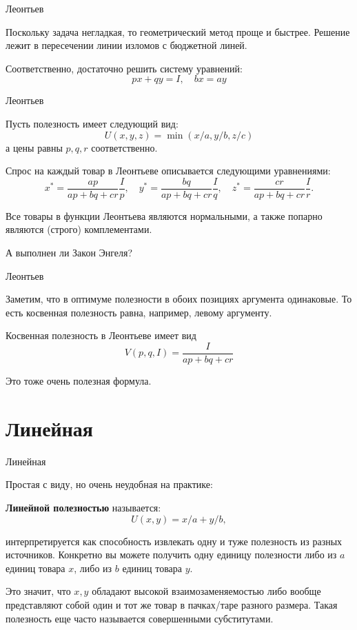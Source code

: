\documentclass{beamer}
\begin{document}
\begin{frame}{Леонтьев}

Поскольку задача негладкая, то геометрический метод проще и быстрее. Решение лежит в пересечении линии изломов с бюджетной линей. 

Соответственно, достаточно решить систему уравнений:
$$ px + qy = I, \quad b x = a y$$

\end{frame}

\begin{frame}{Леонтьев}

Пусть полезность имеет следующий вид:
$$U(x,y,z) = \min(x/a, y/b, z/c)$$ 
а цены равны $p, q, r$ соответственно. 

Спрос на каждый товар в Леонтьеве описывается следующими уравнениями:
$$
x^{\ast} = \frac{ap}{ap + bq + cr} \frac{I}{p}, \quad
y^{\ast} = \frac{bq}{ap + bq + cr} \frac{I}{q}, \quad
z^{\ast} = \frac{cr}{ap + bq + cr} \frac{I}{r}.
$$

Все товары в функции Леонтьева являются нормальными, а также попарно являются (строго) комплементами. 

А выполнен ли Закон Энгеля?

\end{frame}

\begin{frame}{Леонтьев}

Заметим, что в оптимуме полезности в обоих позициях аргумента одинаковые. То есть косвенная полезность равна, например, левому аргументу.


Косвенная полезность в Леонтьеве имеет вид
$$V(p,q,I) = \frac{I}{ap + bq + cr}$$

Это тоже очень полезная формула.

\end{frame}


\section{Линейная}

\begin{frame}{Линейная}

Простая с виду, но очень неудобная на практике:

\begin{definition}
\textbf{Линейной полезностью} называется:
$$U(x, y) = x/a +y/b,$$ 
\end{definition}

интерпретируется как способность извлекать одну и туже полезность из разных источников.  Конкретно вы можете получить одну единицу полезности либо из $a$ единиц товара $x$, либо из $b$ единиц товара $y$. 

Это значит, что $x, y$ обладают высокой взаимозаменяемостью либо вообще представляют собой один и тот же товар в пачках/таре разного размера. Такая полезность еще часто называется \alert{совершенными субститутами}.

\end{frame}
\end{document}
